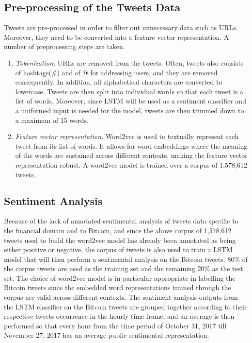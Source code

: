 \documentclass[conference]{IEEEtran}
\begin{document}
\subsection{Pre-processing of the Tweets Data}
\par Tweets are pre-processed in order to filter out unnecessary data such as URLs. Moreover, they need to be converted into a feature vector representation. A number of preprocessing steps are taken.
\begin{enumerate}
\item \textit{Tokenization:} URLs are removed from the tweets. Often, tweets also consists of hashtags(\#) and of @ for addressing users, and they are removed consequently. In addition, all alphabetical characters are converted to lowercase. Tweets are then split into individual words so that each tweet is a list of words. Moreover, since LSTM will be used as a sentiment classifier and a uniformed input is needed for the model, tweets are then trimmed down to a maximum of 15 words.

\item \textit{Feature vector representation:} Word2vec is used to textually represent each tweet from its list of words. It allows for word embeddings where the meaning of the words are sustained across different contexts, making the feature vector representation robust. A word2vec model is trained over a corpus of 1,578,612 tweets.
\end{enumerate}

\subsection{Sentiment Analysis}
\par Because of the lack of annotated sentimental analysis of tweets data specific to the financial domain and to Bitcoin, and since the above corpus of 1,578,612 tweets used to build the word2vec model has already been annotated as being either positive or negative, the corpus of tweets is also used to train a LSTM model that will then perform a sentimental analysis on the Bitcoin tweets. 80\% of the corpus tweets are used as the training set and the remaining 20\% as the test set. The choice of word2vec model is in particular appropriate in labelling the Bitcoin tweets since the embedded word representations trained through the corpus are valid across different contexts. The sentiment analysis outputs from the LSTM classifier on the Bitcoin tweets are grouped together according to their respective tweets occurrence in the hourly time frame, and an average is then performed so that every hour from the time period of October 31, 2017 till November 27, 2017 has an average public sentimental representation.  
\end{document}

